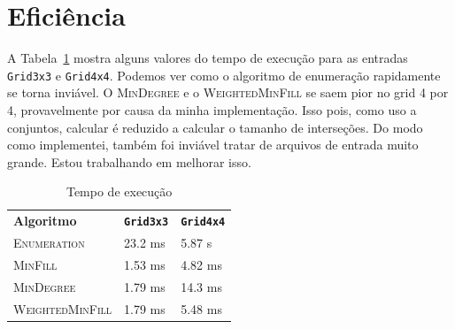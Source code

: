 \documentclass[paper=a4, fontsize=11pt]{scrartcl} %
\numberwithin{equation}{subsection}
\numberwithin{figure}{subsection}
\numberwithin{table}{subsection}
\numberwithin{definition}{subsection}
\numberwithin{theorem}{subsection}
\numberwithin{property}{subsection}
\numberwithin{proposition}{subsection}
\numberwithin{equation}{section}
\numberwithin{figure}{section}
\numberwithin{table}{section}
\numberwithin{definition}{section}
\numberwithin{theorem}{section}
\numberwithin{property}{section}
\numberwithin{proposition}{section}
\begin{document}
\section{Eficiência}

A Tabela~\ref{tab_exec} mostra alguns valores do tempo de execução para as entradas \verb|Grid3x3| e \verb|Grid4x4|. Podemos ver como o algoritmo de enumeração rapidamente se torna inviável. O \textsc{MinDegree} e o \textsc{WeightedMinFill} se saem pior no grid 4 por 4, provavelmente por causa da minha implementação. Isso pois, como uso a conjuntos, calcular é reduzido a calcular o tamanho de interseções. Do modo como implementei, também foi inviável tratar de arquivos de entrada muito grande. Estou trabalhando em melhorar isso.
\begin{table}[]
\centering
\caption{Tempo de execução}
\label{tab_exec}
\begin{tabular}{lll}
\textbf{Algoritmo}          & \textbf{\texttt{Grid3x3}}   & \textbf{\texttt{Grid4x4}}   \\
\textsc{Enumeration}        & 23.2 ms                     & 5.87 s                      \\
\textsc{MinFill}            & 1.53 ms                     & 4.82 ms                     \\
\textsc{MinDegree}          & 1.79 ms                     & 14.3 ms                     \\
\textsc{WeightedMinFill}    & 1.79 ms                     & 5.48 ms                                             
\end{tabular}
\end{table}
\end{document}
